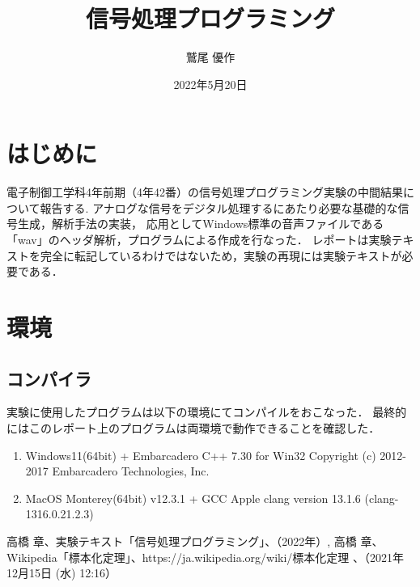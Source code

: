 \documentclass[dvipdfmx,titlepage,a4j]{jsarticle}  %
\title{信号処理プログラミング}
\author{鷲尾 優作}
\date{2022年5月20日}
\begin{document}
\pagestyle{foot}

\maketitle

\section{はじめに}
電子制御工学科4年前期（4年42番）の信号処理プログラミング実験の中間結果について報告する.
アナログな信号をデジタル処理するにあたり必要な基礎的な信号生成，解析手法の実装，
応用としてWindows標準の音声ファイルである「wav」のヘッダ解析，プログラムによる作成を行なった．
レポートは実験テキストを完全に転記しているわけではないため，実験の再現には実験テキストが必要である．

\section{環境}
\subsection{コンパイラ}
実験に使用したプログラムは以下の環境にてコンパイルをおこなった．
最終的にはこのレポート上のプログラムは両環境で動作できることを確認した．

\begin{enumerate}
  \item Windows11(64bit) + Embarcadero C++ 7.30 for Win32 Copyright (c) 2012-2017 Embarcadero Technologies, Inc.
  \item MacOS Monterey(64bit) v12.3.1 + GCC Apple clang version 13.1.6 (clang-1316.0.21.2.3)
\end{enumerate}

\begin{thebibliography}{99}
   高橋 章、実験テキスト「信号処理プログラミング」、（2022年）,
   高橋 章、Wikipedia「標本化定理」、{https://ja.wikipedia.org/wiki/標本化定理} 、（2021年12月15日 (水) 12:16）
\end{thebibliography}
\end{document}
